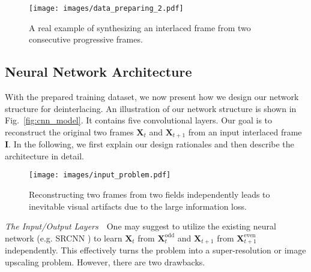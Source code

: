 \documentclass[acmtog]{acmart}
\begin{document}
\begin{figure}[!tp]
\texttt{[image: images/data\_preparing\_2.pdf]}\\
	\caption{A real example of synthesizing an interlaced frame from two consecutive progressive frames.}\label{fig:data_preparing_real}
\end{figure}

\subsection{Neural Network Architecture}

With the prepared training dataset, we now present how we design our network
structure for deinterlacing. An illustration of our network structure is shown
in Fig.~\ref{fig:cnn_model}. It contains five convolutional layers. Our goal is
to reconstruct the original two frames $\mathbf{X}_t$ and $\mathbf{X}_{t+1}$
from an input interlaced frame $\mathbf{I}$. In the following, we first explain
our  design rationales and then describe the architecture in
detail.

\begin{figure}[!tp]
	\centering
\texttt{[image: images/input\_problem.pdf]}\\
	\caption{Reconstructing two frames from two fields independently leads to inevitable visual artifacts due to the large information loss.}\label{fig:input_problem}
\end{figure}

\vspace{0.15in}
\noindent\emph{The Input/Output Layers}\,\,\,\,
One may suggest to utilize the existing neural network (e.g. SRCNN
\cite{dong2016image}) to learn $\mathbf{X}_t$ from
$\mathbf{X}^{\text{odd}}_{t}$ and $\mathbf{X}_{t+1}$ from
$\mathbf{X}^{\text{even}}_{t+1}$ independently. This effectively turns the problem into 
a super-resolution or image upscaling problem.
However, there are two drawbacks.
\end{document}
